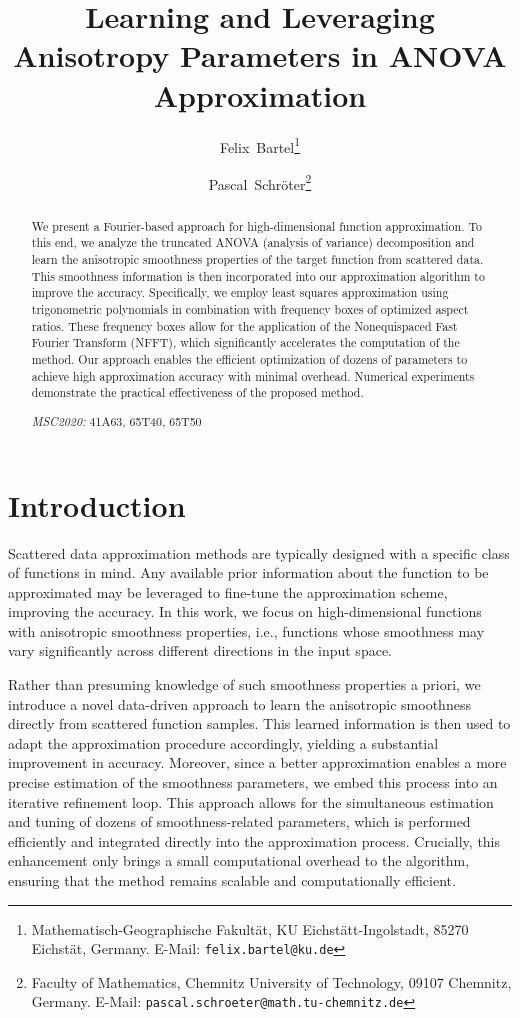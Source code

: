 \documentclass[a4paper]{scrartcl}
\title{Learning and Leveraging Anisotropy Parameters in ANOVA Approximation}
\author{
    Felix~Bartel\thanks{Mathematisch-Geographische Fakultät, KU Eichstätt-Ingolstadt, 85270 Eichstät, Germany.\newline
    E-Mail: \texttt{felix.bartel@ku.de}}
    \and Pascal~Schröter\thanks{Faculty of Mathematics, Chemnitz University of Technology, 09107 Chemnitz, Germany.\newline
    E-Mail: \texttt{pascal.schroeter@math.tu-chemnitz.de}}
}
\numberwithin{equation}{section}
\begin{document}
 

\maketitle
\begin{abstract}
    We present a Fourier-based approach for high-dimensional function approximation.
    To this end, we analyze the truncated ANOVA (analysis of variance) decomposition and learn the anisotropic smoothness properties of the target function from scattered data.
    This smoothness information is then incorporated into our approximation algorithm to improve the accuracy.
    Specifically, we employ least squares approximation using trigonometric polynomials in combination with frequency boxes of optimized aspect ratios.
    These frequency boxes allow for the application of the Nonequispaced Fast Fourier Transform (NFFT), which significantly accelerates the computation of the method.
    Our approach enables the efficient optimization of dozens of parameters to achieve high approximation accuracy with minimal overhead.
    Numerical experiments demonstrate the practical effectiveness of the proposed method.

    \noindent\emph{MSC2020:}
    41A63, 65T40, 65T50  \end{abstract}

\section{Introduction} 

Scattered data approximation methods are typically designed with a specific class of functions in mind.
Any available prior information about the function to be approximated may be leveraged to fine-tune the approximation scheme, improving the accuracy.
In this work, we focus on high-dimensional functions with anisotropic smoothness properties, i.e., functions whose smoothness may vary significantly across different directions in the input space.

Rather than presuming knowledge of such smoothness properties a priori, we introduce a novel data-driven approach to learn the anisotropic smoothness directly from scattered function samples.
This learned information is then used to adapt the approximation procedure accordingly, yielding a substantial improvement in accuracy.
Moreover, since a better approximation enables a more precise estimation of the smoothness parameters, we embed this process into an iterative refinement loop.
This approach allows for the simultaneous estimation and tuning of dozens of smoothness-related parameters, which is performed efficiently and integrated directly into the approximation process.
Crucially, this enhancement only brings a small computational overhead to the algorithm, ensuring that the method remains scalable and computationally efficient.
\end{document}
